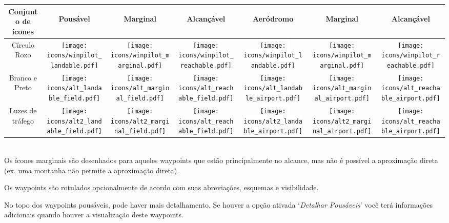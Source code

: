 \begin{tabular}{c|ccc|ccc|}
Conjunto de ícones 
&\begin{sideways}Pousável\end{sideways}
&\begin{sideways}Marginal\end{sideways}
&\begin{sideways}Alcançável\end{sideways}
&\begin{sideways}Aeródromo\end{sideways}
&\begin{sideways}Marginal\end{sideways}
&\begin{sideways}Alcançável\end{sideways}\\
\hline
Círculo Roxo &
\texttt{[image: icons/winpilot\_landable.pdf]} &
\texttt{[image: icons/winpilot\_marginal.pdf]} &
\texttt{[image: icons/winpilot\_reachable.pdf]} &
\colorbox{white}{\texttt{[image: icons/winpilot\_landable.pdf]}} &
\texttt{[image: icons/winpilot\_marginal.pdf]} &
\texttt{[image: icons/winpilot\_reachable.pdf]} \\
\hline
Branco e Preto &
\texttt{[image: icons/alt\_landable\_field.pdf]} &
\texttt{[image: icons/alt\_marginal\_field.pdf]} &
\texttt{[image: icons/alt\_reachable\_field.pdf]} &
\colorbox[rgb]{0.94,0.94,0.94}{\texttt{[image: icons/alt\_landable\_airport.pdf]}} &
\texttt{[image: icons/alt\_marginal\_airport.pdf]} &
\texttt{[image: icons/alt\_reachable\_airport.pdf]} \\
\hline
Luzes de tráfego &
\texttt{[image: icons/alt2\_landable\_field.pdf]} &
\texttt{[image: icons/alt2\_marginal\_field.pdf]} &
\texttt{[image: icons/alt\_reachable\_field.pdf]} &
\colorbox{white}{\texttt{[image: icons/alt2\_landable\_airport.pdf]}} &
\texttt{[image: icons/alt2\_marginal\_airport.pdf]} &
\texttt{[image: icons/alt\_reachable\_airport.pdf]} \\
\hline
\end{tabular} \\

Os ícones marginais são desenhados para aqueles waypoints que estão principalmente no alcance, mas não é possível a aproximação direta (ex. uma montanha não permite a aproximação direta).
  
Os waypoints são rotulados opcionalmente de acordo com suas abreviações, esquemas e visibilidade.

No topo dos waypoints pousáveis, pode haver mais detalhamento.  Se houver a opção ativada 
`{\it Detalhar Pousáveis}' você terá informações adicionais quando houver a visualização deste waypoints.

